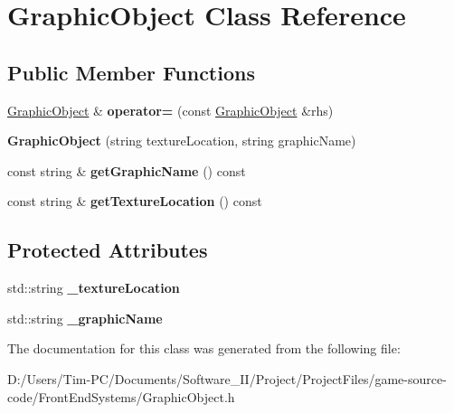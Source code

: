 \hypertarget{class_graphic_object}{}\section{Graphic\+Object Class Reference}
\label{class_graphic_object}
\subsection*{Public Member Functions}
\begin{DoxyCompactItemize}
\item 
\mbox{\label{class_graphic_object_afa2caadef80ca5f40313c5f0ec445776}} 
\hyperlink{class_graphic_object}{Graphic\+Object} \& {\bfseries operator=} (const \hyperlink{class_graphic_object}{Graphic\+Object} \&rhs)
\item 
\mbox{\label{class_graphic_object_a9819ca0b4c1bb72ede070d8485bfc8a9}} 
{\bfseries Graphic\+Object} (string texture\+Location, string graphic\+Name)
\item 
\mbox{\label{class_graphic_object_a8772813296b837e997ee21836e92b028}} 
const string \& {\bfseries get\+Graphic\+Name} () const
\item 
\mbox{\label{class_graphic_object_a1041a2dd82f82fc724675c5a2ea67d32}} 
const string \& {\bfseries get\+Texture\+Location} () const
\end{DoxyCompactItemize}
\subsection*{Protected Attributes}
\begin{DoxyCompactItemize}
\item 
\mbox{\label{class_graphic_object_a3fc571887a6e46dda4a4ef10d44720b5}} 
std\+::string {\bfseries \+\_\+texture\+Location}
\item 
\mbox{\label{class_graphic_object_a74c9292d37d9be9e099c868be084b33f}} 
std\+::string {\bfseries \+\_\+graphic\+Name}
\end{DoxyCompactItemize}


The documentation for this class was generated from the following file\+:\begin{DoxyCompactItemize}
\item 
D\+:/\+Users/\+Tim-\/\+P\+C/\+Documents/\+Software\+\_\+\+I\+I/\+Project/\+Project\+Files/game-\/source-\/code/\+Front\+End\+Systems/Graphic\+Object.\+h\end{DoxyCompactItemize}
